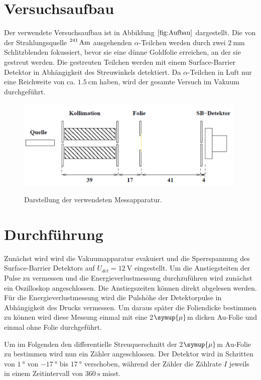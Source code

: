 \section{Versuchsaufbau}
Der verwendete Versuchsaufbau ist in Abbildung $\ref{fig:Aufbau}$ dargestellt. Die von der
Strahlungsquelle $\ce{^{241} Am}$ ausgehenden $\alpha$-Teilchen werden durch zwei $\SI{2}{\mm}$
Schlitzblenden fokussiert, bevor sie eine dünne Goldfolie erreichen, an der sie gestreut werden.
Die gestreuten Teilchen werden mit einem Surface-Barrier Detektor in Abhängigkeit des Streuwinkels
detektiert. Da $\alpha$-Teilchen in Luft nur eine Reichweite von ca. $\SI{1,5}{\cm}$ haben, wird der gesamte
Versuch im Vakuum durchgeführt.
\begin{figure}
  \centering
  \includegraphics[width=11cm]{Aufbau.png}
  \caption{Darstellung der verwendeten Messapparatur.}
  \label{fig:Aufbau}
  \cite{skript}
\end{figure}

\section{Durchführung}
Zunächst wird wird die Vakuumapparatur evakuiert und die Sperrspannung des Surface-Barrier Detektors auf
$U_{det}=\SI{12}{\V}$ eingestellt. Um die Anstiegsteiten der Pulse zu vermessen und die Energieverlustmessung
durchzuführen wird zunächst ein Oszilloskop angeschlossen. Die Anstiegszeiten können direkt abgelesen werden.
Für die Energieverlustmessung wird die Pulshöhe der Detektorpulse in Abhängigkeit des Drucks vermessen. Um
daraus später die Foliendicke bestimmen zu können wird diese Messung einmal mit eine 2\:$\symup{\mu}$m dicken
Au-Folie und einmal ohne Folie durchgeführt.

Um im Folgenden den differentielle Streuquerschnitt der 2\:$\symup{\mu}$m Au-Folie zu bestimmen wird nun ein Zähler
angeschlossen. Der Detektor wird in Schritten von $\SI{1}{\degree}$ von $\SI{-17}{\degree}$ bis $\SI{17}{\degree}$
verschoben, während der Zähler die Zählrate $I$ jeweils in einem Zeitintervall von $\SI{360}{\s}$ misst.


